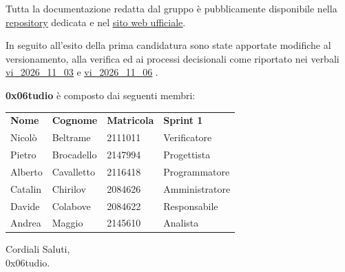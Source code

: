 \documentclass[a4paper, 11pt]{article}
\newcommand{\gruppo}{0x06tudio}
\newcommand{\linksott}[2]{\href{#1}{\uline{#2}}}
\newcommand{\urlverbaletrenov}{https://raw.githubusercontent.com/0x06tudio/docs/main/out/verbali/interni/vi_2026_11_03.pdf}
\newcommand{\urlverbaleseinov}{https://raw.githubusercontent.com/0x06tudio/docs/main/out/verbali/interni/vi_2026_11_06.pdf}
\newcommand{\urlsito}{https://0x06tudio.github.io/docs/html/index.html}
\newcommand{\urlrepo}{https://github.com/0x06tudio/docs/}
\newcommand{\membri}{%
    Nicolò & Beltrame & 2111011 & Verificatore\\
    Pietro & Brocadello & 2147994 & Progettista\\
    Alberto & Cavalletto & 2116418 & Programmatore\\
    Catalin & Chirilov & 2084626 & Amministratore \\
    Davide & Colabove & 2084622 & Responsabile\\
    Andrea & Maggio & 2145610 & Analista\\
}
\begin{document}
\vspace{0.3cm}

\noindent Tutta la documentazione redatta dal gruppo è pubblicamente disponibile nella \linksott{\urlrepo}{repository} dedicata e nel \linksott{\urlsito}{sito web ufficiale}.

\noindent In seguito all'esito della prima candidatura sono state apportate modifiche al versionamento, alla verifica ed ai processi decisionali come riportato nei verbali \linksott{\urlverbaletrenov}{vi\_2026\_11\_03} e \linksott{\urlverbaleseinov}{vi\_2026\_11\_06} .

\vspace{0.5cm}
\noindent \textbf{\gruppo} è composto dai seguenti membri:

\begin{center}
    \begin{tabular}{llll}
        \textbf{Nome} & \textbf{Cognome} & \textbf{Matricola} & \textbf{Sprint 1}\\
        \membri
    \end{tabular}
\end{center}

\vspace{0.5cm}

\noindent Cordiali Saluti,\\
\gruppo.
\end{document}
